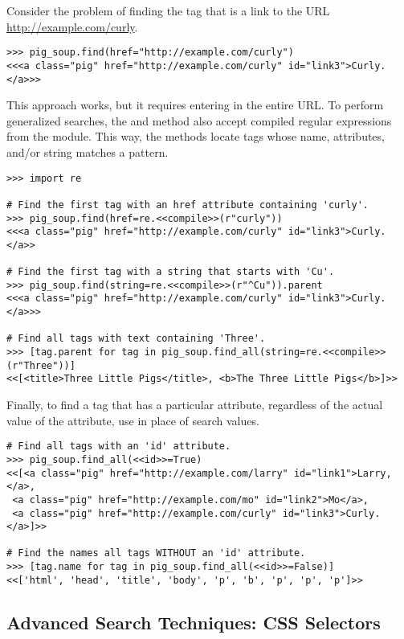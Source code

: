 Consider the problem of finding the tag that is a link to the URL \url{http://example.com/curly}.

\begin{lstlisting}
>>> pig_soup.find(href="http://example.com/curly")
<<<a class="pig" href="http://example.com/curly" id="link3">Curly.</a>>>
\end{lstlisting}

This approach works, but it requires entering in the entire URL.
To perform generalized searches, the  and  method also accept compiled regular expressions from the  module.
This way, the methods locate tags whose name, attributes, and/or string matches a pattern.

\begin{lstlisting}
>>> import re

# Find the first tag with an href attribute containing 'curly'.
>>> pig_soup.find(href=re.<<compile>>(r"curly"))
<<<a class="pig" href="http://example.com/curly" id="link3">Curly.</a>>

# Find the first tag with a string that starts with 'Cu'.
>>> pig_soup.find(string=re.<<compile>>(r"^Cu")).parent
<<<a class="pig" href="http://example.com/curly" id="link3">Curly.</a>>>

# Find all tags with text containing 'Three'.
>>> [tag.parent for tag in pig_soup.find_all(string=re.<<compile>>(r"Three"))]
<<[<title>Three Little Pigs</title>, <b>The Three Little Pigs</b>]>>
\end{lstlisting}

Finally, to find a tag that has a particular attribute, regardless of the actual value of the attribute, use  in place of search values.

\begin{lstlisting}
# Find all tags with an 'id' attribute.
>>> pig_soup.find_all(<<id>>=True)
<<[<a class="pig" href="http://example.com/larry" id="link1">Larry,</a>,
 <a class="pig" href="http://example.com/mo" id="link2">Mo</a>,
 <a class="pig" href="http://example.com/curly" id="link3">Curly.</a>]>>

# Find the names all tags WITHOUT an 'id' attribute.
>>> [tag.name for tag in pig_soup.find_all(<<id>>=False)]
<<['html', 'head', 'title', 'body', 'p', 'b', 'p', 'p', 'p']>>
\end{lstlisting}

\subsection*{Advanced Search Techniques: CSS Selectors} %

